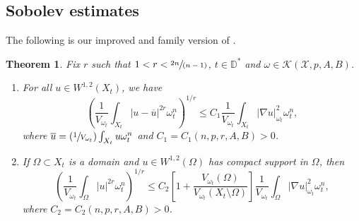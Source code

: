 \documentclass[10pt]{amsart}
\newcommand{\Psfrac}[2]{(\sfrac{#1}{#2})}
\newcommand{\spfrac}[2]{\sfrac{#1}{(#2)}}
\newtheorem{theorem}{Theorem}[section]
\theoremstyle{definition}
\newcommand{\D}{\mathbb D}
\begin{document}
\subsection{Sobolev estimates} \label{sec:sobolev}

The following is our improved and family version of \cite[Th.\,2.1 \& Lem.\,6.2]{GPSS23}.

\begin{theorem} \label{thm:sobolev}
Fix $r$ such that $1<r< \spfrac{2n}{n-1}$, $t \in \D^*$ and $\omega \in {\mathcal K}(\mathcal{X},p,A,B)$.
\begin{enumerate}
\item
For all $u\in W^{1,2}(X_t)$, we have
\[
\left(\frac{1}{V_{\omega_t}} \int_{X_t} |u-\overline{u}|^{2r}\omega_t^n\right)^{1/r}
\leq C_1\frac{1}{V_{\omega_t}} \int_{X_t} |\nabla u|^2_{\omega_t} \omega_t^n,
\]
where $\overline u= \Psfrac{1}{V_{\omega_t}}\int_{X_t} u \omega_t^n$ and $C_1=C_1(n,p,r,A,B)>0$.

\item
If $\Omega \subset X_t$ is a domain and $u\in W^{1,2}(\Omega)$
has compact support in $\Omega$, then
\[
\left( \frac{1}{V_{\omega_t}} \int_{\Omega} |u|^{2r}\omega_t^n \right)^{1/r}
\leq C_2 \left[1+ \frac{V_{\omega_t}(\Omega)}{V_{\omega_t}(X_t \setminus \Omega)} \right]
\frac{1}{V_{\omega_t}} \int_{\Omega} |\nabla u|^2_{\omega_t} \omega_t^n,
\]
where $C_2=C_2(n,p,r,A,B)>0$.
\end{enumerate}
\end{theorem}
\end{document}
